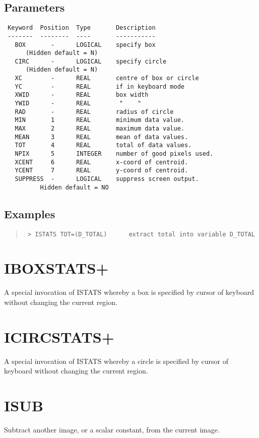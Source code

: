 \documentclass{book}
\renewcommand{\_}{{\tt\char'137}}     %
\begin{document}
\subsection{Parameters}
\begin{verbatim}
 Keyword  Position  Type       Description
 -------  --------  ----       -----------
   BOX       -      LOGICAL    specify box
      (Hidden default = N)
   CIRC      -      LOGICAL    specify circle
      (Hidden default = N)
   XC        -      REAL       centre of box or circle
   YC        -      REAL       if in keyboard mode
   XWID      -      REAL       box width
   YWID      -      REAL        "    "
   RAD       -      REAL       radius of circle
   MIN       1      REAL       minimum data value.
   MAX       2      REAL       maximum data value.
   MEAN      3      REAL       mean of data values.
   TOT       4      REAL       total of data values.
   NPIX      5      INTEGER    number of good pixels used.
   XCENT     6      REAL       x-coord of centroid.
   YCENT     7      REAL       y-coord of centroid.
   SUPPRESS  -      LOGICAL    suppress screen output.
          Hidden default = NO

\end{verbatim}\subsection{Examples}
\begin{quote}\begin{verbatim}
 > ISTATS TOT=(D_TOTAL)      extract total into variable D_TOTAL
 \end{verbatim}\end{quote}
\section{IBOXSTATS+}
A special invocation of ISTATS whereby a box is specified
by cursor of keyboard without changing the current region.

\section{ICIRCSTATS+}
A special invocation of ISTATS whereby a circle is specified
by cursor of keyboard without changing the current region.

\section{ISUB}
Subtract another image, or a scalar constant, from the current
image.
\end{document}
